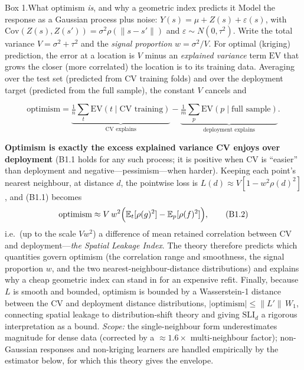 \documentclass[11pt,a4paper]{article}
\newcommand{\SLI}{\mathrm{SLI}}
\newcommand{\SLId}{\SLI_{d}}
\newcommand{\EV}{\mathrm{EV}}
\newcommand{\E}{\mathbb{E}}
\begin{document}
\begin{meebox}{Box 1.\quad What optimism \emph{is}, and why a geometric index
predicts it}
\small
Model the response as a Gaussian process plus noise:
$Y(s)=\mu+Z(s)+\varepsilon(s)$, with $\mathrm{Cov}(Z(s),Z(s'))=\sigma^2\rho(\lVert
s-s'\rVert)$ and $\varepsilon\sim N(0,\tau^2)$. Write the total variance
$V=\sigma^2+\tau^2$ and the \emph{signal proportion} $w=\sigma^2/V$. For optimal
(kriging) prediction, the error at a location is $V$ minus an \emph{explained
variance} term $\EV$ that grows the closer (more correlated) the location is to its
training data. Averaging over the test set (predicted from CV training folds) and
over the deployment target (predicted from the full sample), the constant $V$
cancels and

\vspace{-1.0em}
\[
\text{optimism}
=\underbrace{\tfrac1n\textstyle\sum_t \EV(t\mid \text{CV training})}_{\text{CV explains}}
-\underbrace{\tfrac1m\textstyle\sum_p \EV(p\mid \text{full sample})}_{\text{deployment explains}} .
\tag{B1.1}
\]

\vspace{-0.3em}
\noindent\textbf{Optimism is exactly the excess explained variance CV enjoys over
deployment} (B1.1 holds for any such process; it is positive when CV is ``easier''
than deployment and negative---pessimism---when harder). Keeping each point's
nearest neighbour, at distance $d$, the pointwise loss is
$L(d)\approx V[1-w^2\rho(d)^2]$, and (B1.1) becomes
\[
\text{optimism}\approx V\,w^2\Bigl(\E_t[\rho(g)^2]-\E_p[\rho(f)^2]\Bigr),
\tag{B1.2}
\]
i.e.\ (up to the scale $Vw^2$) a difference of mean retained correlation between CV
and deployment---\emph{the Spatial Leakage Index}. The theory therefore predicts
which quantities govern optimism (the correlation range and smoothness, the signal
proportion $w$, and the two nearest-neighbour-distance distributions) and explains
why a cheap geometric index can stand in for an expensive refit. Finally, because
$L$ is smooth and bounded, optimism is bounded by a Wasserstein-1 distance between
the CV and deployment distance distributions,
$|\text{optimism}|\le \lVert L'\rVert\, W_1$, connecting spatial leakage to
distribution-shift theory and giving $\SLId$ a rigorous interpretation as a bound.
\emph{Scope:} the single-neighbour form underestimates magnitude for dense data
(corrected by a $\approx1.6\times$ multi-neighbour factor); non-Gaussian responses
and non-kriging learners are handled empirically by the estimator below, for which
this theory gives the envelope.
\end{meebox}
\end{document}
